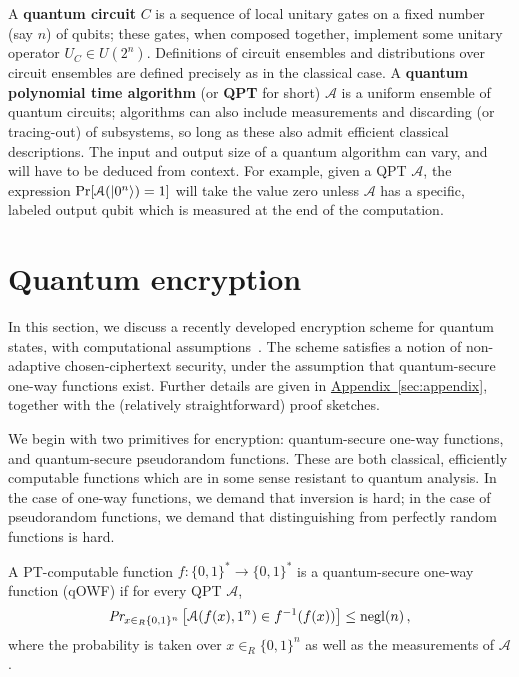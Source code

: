 \documentclass[envcountsame]{llncs}
\numberwithin{equation}{section}
\newcommand{\opn}{\operatorname}
\newcommand{\expref}[2]{\texorpdfstring{\hyperref[#2]{#1~\ref{#2}}}{#1~\ref{#2}}}
\newcommand{\algo}{\mathcal}
\newcommand{\negl}{\opn{negl}}
\newcommand{\inrand}{\in_R}
\begin{document}
A \textbf{quantum circuit} $C$ is a sequence of local unitary gates on a fixed number (say $n$) of qubits; these gates, when composed together, implement some unitary operator $U_C \in U(2^n)$. Definitions of circuit ensembles and distributions over circuit ensembles are defined precisely as in the classical case. A \textbf{quantum polynomial time algorithm} (or \textbf{QPT} for short) $\mathcal A$ is a uniform ensemble of quantum circuits; algorithms can also include measurements and discarding (or tracing-out) of subsystems, so long as these also admit efficient classical descriptions. The input and output size of a quantum algorithm can vary, and will have to be deduced from context. For example, given a QPT $\mathcal A$, the expression $\Pr[\mathcal A({\left\vert{0^n}\right\rangle}) = 1]$ will take the value zero unless $\mathcal A$ has a specific, labeled output qubit which is measured at the end of the computation.

\section{Quantum encryption}\label{sec:encryption}

In this section, we discuss a recently developed encryption scheme for quantum states, with computational assumptions~\cite{ABFGSS16}. The scheme satisfies a notion of non-adaptive chosen-ciphertext security, under the assumption that quantum-secure one-way functions exist. Further details are given in \expref{Appendix}{sec:appendix}, together with the (relatively straightforward) proof sketches.

We begin with two primitives for encryption: quantum-secure one-way functions, and quantum-secure pseudorandom functions. These are both classical, efficiently computable functions which are in some sense resistant to quantum analysis. In the case of one-way functions, we demand that inversion is hard; in the case of pseudorandom functions, we demand that distinguishing from perfectly random functions is hard.

\begin{definition}\label{def:quantum-secure-owf}
A PT-computable function $f:\{0,1\}^* \rightarrow \{0, 1\}^*$ is a quantum-secure one-way function (qOWF) if for every QPT $\algo A$, 
$$
\emph{Pr}_{x \inrand \{0, 1\}^n} \left[\algo A (f(x), 1^n) \in f^{-1}(f(x)) \right] \leq \negl(n)\,,
$$
where the probability is taken over $x \inrand \{0, 1\}^n$ as well as the measurements of $\algo A$.
\end{definition}
\end{document}
